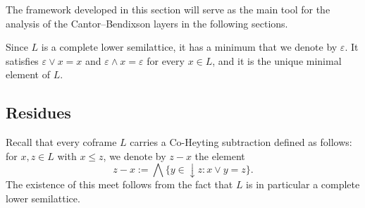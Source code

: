 \documentclass{article}
\newtheorem{notation}[theorem]{Notation}
\begin{document}
The framework developed in this section will serve as the main tool for the analysis of the Cantor–Bendixson layers in the following sections.




Since $L$ is a complete lower semilattice, it has a minimum that we denote by $\varepsilon$. It satisfies $\varepsilon \vee x = x$ and $\varepsilon \wedge x = \varepsilon$ for every $x \in L$, and it is the unique minimal element of $L$. 

\subsection{Residues\label{section.residues}}

Recall that every coframe $L$ carries a Co-Heyting subtraction defined as follows: for $x,z \in L$ with $x \le z$, we denote by $z - x$ the element
\[z - x := \bigwedge \{y \in \mathop{\downarrow}z : x \vee y = z\}.\]
The existence of this meet follows from the fact that $L$ is in particular a complete lower semilattice.
\end{document}
